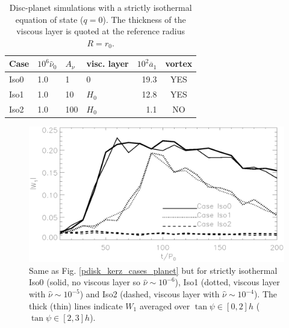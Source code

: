 \begin{table}
  \centering
  \caption{Disc-planet simulations with a strictly
    isothermal equation of state ($q=0$). The thickness of the viscous layer
    is quoted at the reference radius $R=r_0$. \label{planet_sims_iso}}
    \begin{tabular}{llllrc}
      \hline\hline
      Case & $10^6\hat{\nu}_0$ & $A_\nu$ & visc. layer& $10^2\overline{a}_1$ &vortex \\ 
      \hline
      Iso0   & 1.0  & 1          & 0      & 19.3  &  YES   \\
      Iso1   & 1.0  & 10         & $H_0$  & 12.8  &  YES     \\ 
      Iso2   & 1.0  & 100        & $H_0$  & 1.1  &  NO     \\ 
      \hline
  \end{tabular}
\end{table}



\begin{figure}
  \centering
  \includegraphics[width=\linewidth]{figures/pdisk_kerz_cases_iso}
  \caption{Same as Fig. \ref{pdisk_kerz_cases_planet} but for strictly
    isothermal Iso0 (solid, no viscous layer so $\hat{\nu}\sim10^{-6}$), Iso1
    (dotted, viscous layer with $\hat{\nu}\sim10^{-5}$) and Iso2
    (dashed, viscous layer with $\hat{\nu}\sim10^{-4}$). The thick (thin) lines indicate
    $W_1$ averaged over $\tan{\psi}\in[0,2]h$
    ($\tan{\psi}\in[2,3]h$).  
    \label{pdisk_kerz_cases_planet_iso}}
\end{figure}

